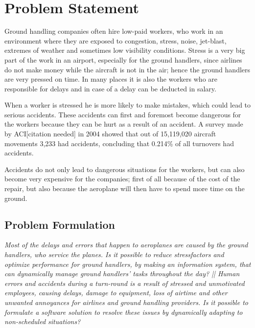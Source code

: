 \section{Problem Statement}

Ground handling companies often hire low-paid workers, who work in an environment where they are exposed to congestion, stress, noise, jet-blast, extremes of weather and sometimes low visibility conditions. Stress is a very big part of the work in an airport, especially for the ground handlers, since airlines do not make money while the aircraft is not in the air; hence the ground handlers are very pressed on time.  In many places it is also the workers who are responsible for delays and in case of a delay can be deducted in salary.

When a worker is stressed he is more likely to make mistakes, which could lead to serious accidents. These accidents can first and foremost become dangerous for the workers because they can be hurt as a result of an accident. A survey made by ACI[citation needed] in 2004 showed that out of 15,119,020 aircraft movements 3,233 had accidents, concluding that 0.214\% of all turnovers had accidents.

Accidents do not only lead to dangerous situations for the workers, but can also become very expensive for the companies; first of all because of the cost of the repair, but also because the aeroplane will then have to spend more time on the ground.
\subsection{Problem Formulation}
\begin{center}
\textit{Most of the delays and errors that happen to aeroplanes are caused by the ground handlers, who service the planes. Is it possible to reduce stressfactors and optimize performance for ground handlers, by making an information system, that can dynamically manage ground handlers' tasks throughout the day? || Human errors and accidents during a turn-round is a result of stressed and unmotivated employees, causing delays, damage to equipment, loss of airtime and other unwanted annoyances for airlines and ground handling providers. Is it possible to formulate a software solution to resolve these issues by dynamically adapting to non-scheduled situations?}
\end{center}
